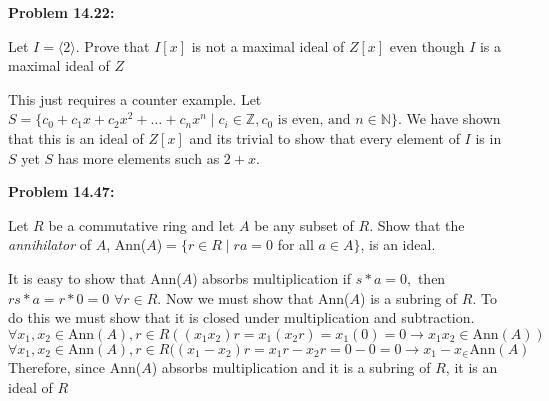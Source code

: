 \documentclass[a4paper, 11pt]{article}
\begin{document}
\noindent\textbf{Problem 14.22:}
    
    Let $I= \langle 2\rangle$. Prove that $I[x]$ is not a maximal ideal of $Z[x]$ even though $I$ is a maximal ideal of $Z$
    
    This just requires a counter example. Let $S=\{c_0+c_1x+c_2x^2+\dots +c_nx^n \mid c_i\in\mathbb{Z}, c_0 \text{ is even, and  }n\in\mathbb{N}\} $. We have shown that this is an ideal of $Z[x]$ and its trivial to show that every element of $I$ is in $S$ yet $S$ has more elements such as $2+x$.
    
\noindent\textbf{Problem 14.47:}
    
    Let $R$ be a commutative ring and let $A$ be any subset of $R$. Show that the \textit{annihilator} of $A$, Ann($A$)$=\{r\in R \mid ra=0 $ for all $a\in A\}$, is an ideal.
    
    It is easy to show that Ann($A$) absorbs multiplication if $s*a=0,$ then $rs*a=r*0=0$ $\forall r\in R$. Now we must show that Ann($A$) is a subring of $R$. To do this we must show that it is closed under multiplication and subtraction. \singlespacing
    $$\forall x_1,x_2\in \text{Ann}(A),r\in R((x_1x_2)r=x_1(x_2r)=x_1(0)=0 \rightarrow x_1x_2\in\text{Ann}(A))$$
    $$\forall x_1,x_2\in \text{Ann}(A),r\in R((x_1-x_2)r=x_1r-x_2r=0-0=0\rightarrow x_1-x_\in \text{Ann}(A)$$
    \doublespacing
    Therefore, since Ann($A$) absorbs multiplication and it is a subring of $R$, it is an ideal of $R$
\end{document}

